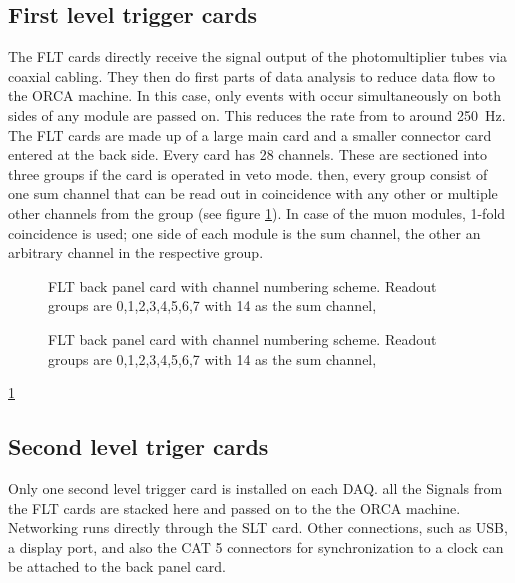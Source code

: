   \subsection{First level trigger cards}
  \label{ch:DAQ:sec:FLTs}
  The FLT cards directly receive the signal output of the photomultiplier tubes via coaxial cabling. They then do first parts of data analysis to reduce data flow to the ORCA machine. In this case, only events with occur simultaneously on both sides of any module are passed on. This reduces the rate from  to around \SI{250}{\hertz}. The FLT cards are made up of a large main card and a smaller connector card entered at the back side. Every card has 28 channels. These are sectioned into three groups if the card is operated in veto mode. then, every group consist of one sum channel that can be read out in coincidence with any other or multiple other channels from the group (see figure \ref{fig:DAQ:FLTFront}). In case of the muon modules, 1-fold coincidence is used; one side of each module is the sum channel, the other an arbitrary channel in the respective group.
  
  \begin{figure}
	  \caption[FLT back panel card]{FLT back panel card with channel numbering scheme. Readout groups are 0,1,2,3,4,5,6,7 with 14 as the sum channel,}
	  \label{fig:DAQ:FLTFront}
  \end{figure}
  \begin{figure}
	  \caption[FLT back panel card]{FLT back panel card with channel numbering scheme. Readout groups are 0,1,2,3,4,5,6,7 with 14 as the sum channel,}
	  \label{fig:DAQ:FLTBack}
  \end{figure}
  \ref{fig:DAQ:FLTFront}
  \subsection{Second level triger cards}
  \label{ch:DAQ:sec:SLTs}
  Only one second level trigger card is installed on each DAQ. all the Signals from the FLT cards are stacked here and passed on to the the ORCA machine. Networking runs directly through the SLT card. Other connections, such as USB, a display port, and also the CAT 5 connectors for synchronization to a clock can be attached to the back panel card.


